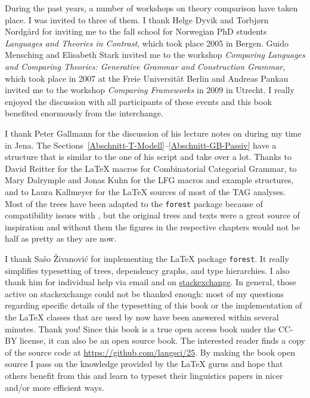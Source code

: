 During the past years, a number of workshops on theory comparison have taken place. I was invited to three of them.
I thank Helge Dyvik and Torbjørn Nordgård for inviting me to the fall school for Norwegian PhD
students  \emph{Languages and Theories in Contrast}, which took place 2005 in Bergen. Guido
Mensching and Elisabeth
Stark invited me to the workshop \emph{Comparing Languages and Comparing Theories:
  Generative Grammar and Construction Grammar}, which took place in 2007 at the Freie Universität
Berlin and Andreas Pankau invited me to the workshop \emph{Comparing
  Frameworks} in 2009 in Utrecht. I really enjoyed the discussion with all participants of these
events and this book benefited enormously from the interchange.

I thank Peter Gallmann for the discussion of his lecture notes on \gb
during my time in Jena. The Sections~\ref{Abschnitt-T-Modell}--\ref{Abschnitt-GB-Passiv} have a
structure that is similar to the one of his script and take over a lot. Thanks to David Reitter for
the \LaTeX{} macros for Combinatorial Categorial Grammar, to Mary Dalrymple and Jonas Kuhn for the LFG
macros and example structures, and to Laura Kallmeyer for the \LaTeX{} sources of most of the TAG
analyses. Most of the trees have been adapted to the \texttt{forest} package because of compatibility issues
with \XeLaTeX, but the original trees and texts were a great source of inspiration and without them
the figures in the respective chapters would not be half as pretty as they are now.

I thank Sašo Živanović for implementing the \LaTeX{} package \texttt{forest}. It really simplifies
typesetting of trees, dependency graphs, and type hierarchies. I also thank him for individual help
via email and on \href{http://www.stackexchange.com}{stackexchange}. In general, those active on stackexchange could not be thanked
enough: most of my questions regarding specific details of the typesetting of this book or the
implementation of the \LaTeX{} classes that are used by \lsp now have been answered within several
minutes. Thank you! Since this book is a true open access book under the CC-BY license, it can also
be an open source book. The interested reader finds a copy of the source code at \url{https://github.com/langsci/25}. By making the book open source I pass on the knowledge provided by the \LaTeX{} gurus and
hope that others benefit from this and learn to typeset their linguistics papers in nicer and/or
more efficient ways.


